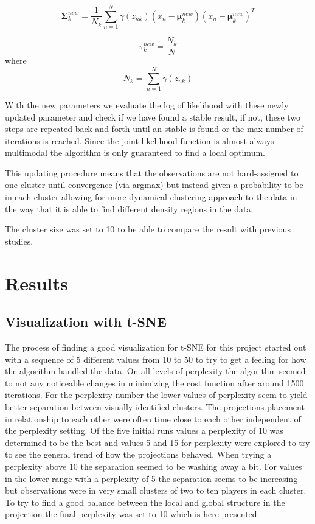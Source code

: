 \documentclass{article}
\begin{document}
$$\mathbf{\Sigma}_k^{new} = \frac{1}{N_k} \sum_{n=1}^N\gamma(z_{nk})(x_n-\mathbf{\mu}_k^{new})(x_n-\mathbf{\mu}_k^{new})^T$$

$$ \pi_k^{new}= \frac{N_k}{N} $$ 
where
$$  N_k = \sum_{n=1}^N \gamma(z_{nk})$$

With the new parameters we evaluate the log of likelihood with these newly updated parameter and check if we have found a stable result, if not, these two steps are repeated back and forth until an stable is found or the max number of iterations is reached. Since the joint likelihood function is almost always multimodal the algorithm is only guaranteed to find a local optimum.

This updating procedure means that the observations are not hard-assigned to one cluster until convergence (via argmax) but instead given a probability to be in each cluster allowing for more dynamical clustering approach to the data in the way that it is able to find different density regions in the data.

The cluster size was set to 10 to be able to compare the result with previous studies.





\newpage

\section{Results}

\subsection{Visualization with t-SNE}

The process of finding a good visualization for t-SNE for this project started out with a sequence of 5 different values from 10 to 50 to try to get a feeling for how the algorithm handled the data. On all levels of perplexity the algorithm seemed to not any noticeable changes in minimizing the cost function after around 1500 iterations. For the perplexity number the lower values of perplexity seem to yield better separation between visually identified clusters. The projections placement in relationship to each other were often time close to each other independent of the perplexity setting. Of the five initial runs values a perplexity of 10 was determined to be the best and values 5 and 15 for perplexity were explored to try to see the general trend of how the projections behaved. When trying a perplexity above 10 the separation seemed to be washing away a bit. For values in the lower range with a perplexity of 5 the separation seems to be increasing but observations were in very small clusters of two to ten players in each cluster. To try to find a good balance between the local and global structure in the projection the final perplexity was set to 10 which is here presented.
\end{document}
